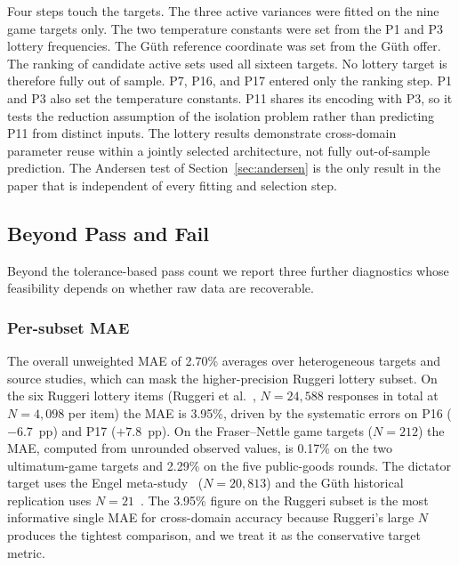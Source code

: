 \documentclass[journal]{IEEEtran}
\begin{document}
Four steps touch the targets.
The three active variances were fitted on the nine game targets only.
The two temperature constants were set from the P1 and P3 lottery frequencies.
The G\"uth reference coordinate was set from the G\"uth offer.
The ranking of candidate active sets used all sixteen targets.
No lottery target is therefore fully out of sample.
P7, P16, and P17 entered only the ranking step.
P1 and P3 also set the temperature constants.
P11 shares its encoding with P3, so it tests the reduction assumption of the isolation problem rather than predicting P11 from distinct inputs.
The lottery results demonstrate cross-domain parameter reuse within a jointly selected architecture, not fully out-of-sample prediction.
The Andersen test of Section~\ref{sec:andersen} is the only result in the paper that is independent of every fitting and selection step.

\subsection{Beyond Pass and Fail}
\label{sec:statistical-eval}

Beyond the tolerance-based pass count we report three further diagnostics whose feasibility depends on whether raw data are recoverable.

\subsubsection{Per-subset MAE}
The overall unweighted MAE of 2.70\% averages over heterogeneous targets and source studies, which can mask the higher-precision Ruggeri lottery subset.
On the six Ruggeri lottery items (Ruggeri et al.~\cite{ruggeri2020}, $N=24{,}588$ responses in total at $N=4{,}098$ per item) the MAE is 3.95\%, driven by the systematic errors on P16 ($-6.7$~pp) and P17 ($+7.8$~pp).
On the Fraser--Nettle game targets ($N=212$) the MAE, computed from unrounded observed values, is 0.17\% on the two ultimatum-game targets and 2.29\% on the five public-goods rounds.
The dictator target uses the Engel meta-study~\cite{engel2011} ($N=20{,}813$) and the G\"uth historical replication uses $N=21$~\cite{guth1982}.
The 3.95\% figure on the Ruggeri subset is the most informative single MAE for cross-domain accuracy because Ruggeri's large $N$ produces the tightest comparison, and we treat it as the conservative target metric.
\end{document}
